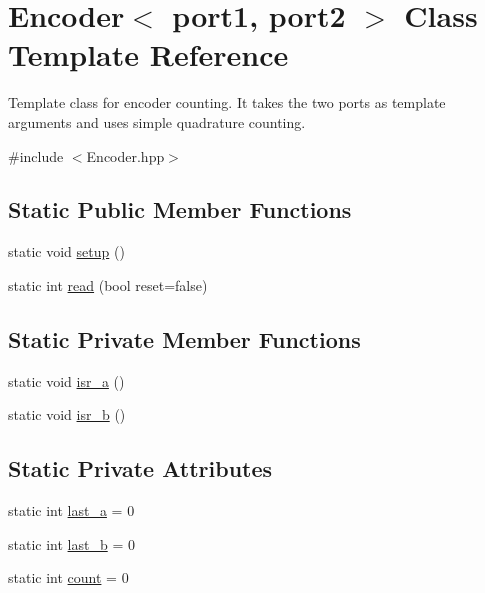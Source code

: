 \hypertarget{classEncoder}{\section{Encoder$<$ port1, port2 $>$ Class Template Reference}
\label{classEncoder}
}


Template class for encoder counting. It takes the two ports as template arguments and uses simple quadrature counting.  




{\ttfamily \#include $<$Encoder.\-hpp$>$}

\subsection*{Static Public Member Functions}
\begin{DoxyCompactItemize}
\item 
static void \hyperlink{classEncoder_a7945aef1fa1eef9c69eae3059c7383f5}{setup} ()
\item 
static int \hyperlink{classEncoder_ad4a82c2cb43afce3149e206e42796173}{read} (bool reset=false)
\end{DoxyCompactItemize}
\subsection*{Static Private Member Functions}
\begin{DoxyCompactItemize}
\item 
static void \hyperlink{classEncoder_ac4291694602efae2fd808c622aa08466}{isr\-\_\-a} ()
\item 
static void \hyperlink{classEncoder_a13da10ca35269f3e369c637e3fe492e9}{isr\-\_\-b} ()
\end{DoxyCompactItemize}
\subsection*{Static Private Attributes}
\begin{DoxyCompactItemize}
\item 
static int \hyperlink{classEncoder_af68226c82a0ec90d00cc40d733ca9eab}{last\-\_\-a} = 0
\item 
static int \hyperlink{classEncoder_a5a4bc2fcd23a97e69a47ecf3cd6e0914}{last\-\_\-b} = 0
\item 
static int \hyperlink{classEncoder_a7f71986ee5780e0fe3a91c93b7116c38}{count} = 0
\end{DoxyCompactItemize}


